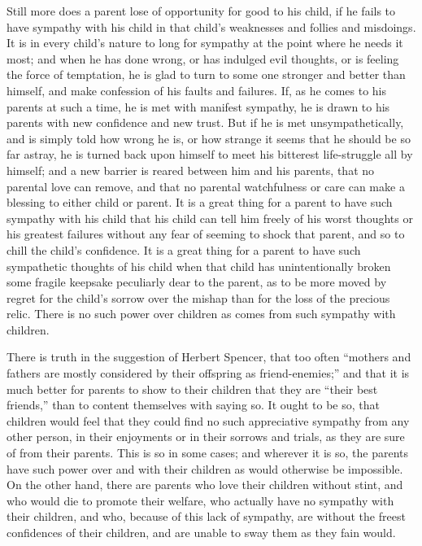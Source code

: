 \documentclass[
]{book}
\begin{document}
Still more does a parent lose of opportunity for good to his child, if he fails to have sympathy with his child in that child's weaknesses and follies and misdoings. It is in every child's nature to long for sympathy at the point where he needs it most; and when he has done wrong, or has indulged evil thoughts, or is feeling the force of temptation, he is glad to turn to some one stronger and better than himself, and make confession of his faults and failures. If, as he comes to his parents at such a time, he is met with manifest sympathy, he is drawn to his parents with new confidence and new trust. But if he is met unsympathetically, and is simply told how wrong he is, or how strange it seems that he should be so far astray, he is turned back upon himself to meet his bitterest life-struggle all by himself; and a new barrier is reared between him and his parents, that no parental love can remove, and that no parental watchfulness or care can make a blessing to either child or parent. It is a great thing for a parent to have such sympathy with his child that his child can tell him freely of his worst thoughts or his greatest failures without any fear of seeming to shock that parent, and so to chill the child's confidence. It is a great thing for a parent to have such sympathetic thoughts of his child when that child has unintentionally broken some fragile keepsake peculiarly dear to the parent, as to be more moved by regret for the child's sorrow over the mishap than for the loss of the precious relic. There is no such power over children as comes from such sympathy with children.

There is truth in the suggestion of Herbert Spencer, that too often ``mothers and fathers are mostly considered by their offspring as friend-enemies;'' and that it is much better for parents to show to their children that they are ``their best friends,'' than to content themselves with saying so. It ought to be so, that children would feel that they could find no such appreciative sympathy from any other person, in their enjoyments or in their sorrows and trials, as they are sure of from their parents. This is so in some cases; and wherever it is so, the parents have such power over and with their children as would otherwise be impossible. On the other hand, there are parents who love their children without stint, and who would die to promote their welfare, who actually have no sympathy with their children, and who, because of this lack of sympathy, are without the freest confidences of their children, and are unable to sway them as they fain would.
\end{document}
